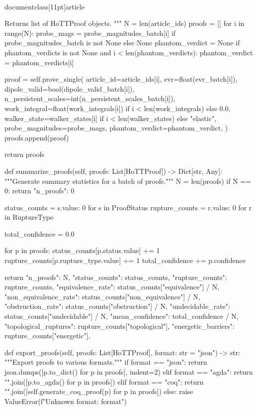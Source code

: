 \\documentclass[11pt]{article}
\begin{document}
\begin{CodeBlock}
        Returns list of HoTTProof objects.
        """
        N = len(article_ids)
        proofs = []
        for i in range(N):
            probe_mags = probe_magnitudes_batch[i] if probe_magnitudes_batch is not None else None
            phantom_verdict = None
            if phantom_verdicts is not None and i < len(phantom_verdicts):
                phantom_verdict = phantom_verdicts[i]

            proof = self.prove_single(
                article_id=article_ids[i],
                evr=float(evr_batch[i]),
                dipole_valid=bool(dipole_valid_batch[i]),
                n_persistent_scales=int(n_persistent_scales_batch[i]),
                work_integral=float(work_integrals[i]) if i < len(work_integrals) else 0.0,
                walker_state=walker_states[i] if i < len(walker_states) else "elastic",
                probe_magnitudes=probe_mags,
                phantom_verdict=phantom_verdict,
            )
            proofs.append(proof)

        return proofs

    def summarize_proofs(self, proofs: List[HoTTProof]) -> Dict[str, Any]:
        """Generate summary statistics for a batch of proofs."""
        N = len(proofs)
        if N == 0:
            return {"n_proofs": 0}

        status_counts = {s.value: 0 for s in ProofStatus}
        rupture_counts = {r.value: 0 for r in RuptureType}

        total_confidence = 0.0

        for p in proofs:
            status_counts[p.status.value] += 1
            rupture_counts[p.rupture_type.value] += 1
            total_confidence += p.confidence

        return {
            "n_proofs": N,
            "status_counts": status_counts,
            "rupture_counts": rupture_counts,
            "equivalence_rate": status_counts["equivalence"] / N,
            "non_equivalence_rate": status_counts["non_equivalence"] / N,
            "obstruction_rate": status_counts["obstruction"] / N,
            "undecidable_rate": status_counts["undecidable"] / N,
            "mean_confidence": total_confidence / N,
            "topological_ruptures": rupture_counts["topological"],
            "energetic_barriers": rupture_counts["energetic"],
        }

    def export_proofs(self, proofs: List[HoTTProof], format: str = "json") -> str:
        """Export proofs to various formats."""
        if format == "json":
            return json.dumps([p.to_dict() for p in proofs], indent=2)
        elif format == "agda":
            return "\n\n".join([p.to_agda() for p in proofs])
        elif format == "coq":
            return "\n\n".join([self.generate_coq_proof(p) for p in proofs])
        else:
            raise ValueError(f"Unknown format: {format}")


\end{CodeBlock}
\end{document}
